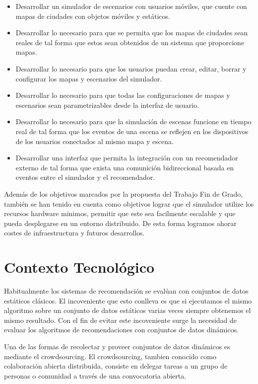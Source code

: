 \begin{itemize}
	\item Desarrollar un simulador de escenarios con usuarios móviles, que cuente con mapas de ciudades con objetos móviles y estáticos.
	\item Desarrollar lo necesario para que se permita que los mapas de ciudades sean reales de tal forma que estos sean obtenidos de un sistema que proporcione mapas.
       \item Desarrollar lo necesario para que los usuarios puedan crear, editar, borrar y configurar los mapas y escenarios del simulador.
       \item Desarrollar lo necesario para que todas las configuraciones de mapas y escenarios sean parametrizables desde la interfaz de usuario.
       \item Desarrollar lo necesario para que la simulación de escenas funcione en tiempo real de tal forma que los eventos de una escena se reflejen en los dispositivos de los usuarios conectados al mismo mapa y escena.
       \item Desarrollar una interfaz que permita la integración con un recomendador externo de tal forma que exista una comunición bidireccional basada en eventos entre el simulador y el recomendador.
\end{itemize}

Además de los objetivos marcados por la propuesta del Trabajo Fin de Grado, también se han tenido en cuenta como objetivos lograr que el simulador utilize los recursos hardware minimos, permitir que este sea facilmente escalable y que pueda desplegarse en un entorno distribuido. De esta forma logramos ahorar costes de infraestructura y futuros desarrollos.

\section{Contexto Tecnológico}
\thispagestyle{empty}

Habitualmente los sistemas de recomendación se evalúan con conjuntos de datos estáticos clásicos. El incoveniente que esto conlleva es que si ejecutamos el mismo algoritmo sobre un conjunto de datos estáticos varias veces siempre obtenemos el mismo resultado. Con el fin de evitar este incoveniente surge la necesidad de evaluar los algoritmos de recomendaciones con conjuntos de datos dinámicos. 

Una de las formas de recolectar y proveer conjuntos de datos dinámicos es mediante el crowdsourcing. El crowdsourcing, tambien conocido como colaboración abierta distribuida, consiste en delegar tareas a un grupo de personas o comunidad a través de una convocatoria abierta. 

